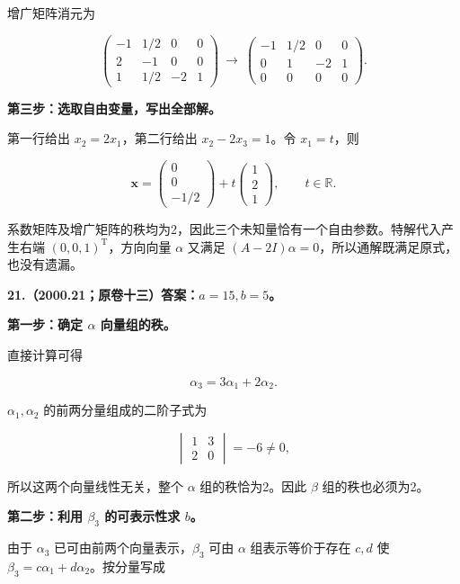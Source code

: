 \documentclass[UTF8,11pt,fontset=windows]{ctexart}
\begin{document}
增广矩阵消元为

$$
\begin{pmatrix}-1&1/2&0&0\\2&-1&0&0\\1&1/2&-2&1\end{pmatrix}
\ \longrightarrow\
\begin{pmatrix}-1&1/2&0&0\\0&1&-2&1\\0&0&0&0\end{pmatrix}.
$$

\textbf{第三步：选取自由变量，写出全部解。}

第一行给出 $x_2=2x_1$，第二行给出 $x_2-2x_3=1$。令 $x_1=t$，则

$$
\boxed{\boldsymbol x=
\begin{pmatrix}0\\0\\-1/2\end{pmatrix}
+t\begin{pmatrix}1\\2\\1\end{pmatrix},\qquad t\in\mathbb R.}
$$

系数矩阵及增广矩阵的秩均为2，因此三个未知量恰有一个自由参数。特解代入产生右端 $(0,0,1)^{\mathrm T}$，方向向量 $\alpha$ 又满足 $(A-2I)\alpha=0$，所以通解既满足原式，也没有遗漏。

\clearpage

\textbf{21.（2000.21；原卷十三）答案：$a=15,b=5$。}

\textbf{第一步：确定 $\alpha$ 向量组的秩。}

直接计算可得

$$
\alpha_3=3\alpha_1+2\alpha_2.
$$

$\alpha_1,\alpha_2$ 的前两分量组成的二阶子式为

$$
\begin{vmatrix}1&3\\2&0\end{vmatrix}=-6\ne0,
$$

所以这两个向量线性无关，整个 $\alpha$ 组的秩恰为2。因此 $\beta$ 组的秩也必须为2。

\textbf{第二步：利用 $\beta_3$ 的可表示性求 $b$。}

由于 $\alpha_3$ 已可由前两个向量表示，$\beta_3$ 可由 $\alpha$ 组表示等价于存在 $c,d$ 使 $\beta_3=c\alpha_1+d\alpha_2$。按分量写成
\end{document}
